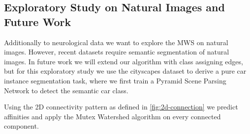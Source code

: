 
\subsection*{Exploratory Study on Natural Images and Future Work}

Additionally to neurological data we want to explore the MWS on natural images. However, recent datasets \cite{Cordts2016Cityscapes,lin2014microsoft,mottaghi_cvpr14} require semantic segmentation of natural images. In future work we will extend our algorithm with class assigning edges, but for this exploratory study we use the cityscapes dataset\cite{Cordts2016Cityscapes} to derive a pure car instance segmentation task, where we first train a Pyramid Scene Parsing Network\cite{zhao2017pyramid} to detect the semantic car class. 

Using the 2D connectivity pattern as defined in \autoref{fig:2d-connection} we predict affinities and apply the Mutex Watershed algorithm on every connected component.


